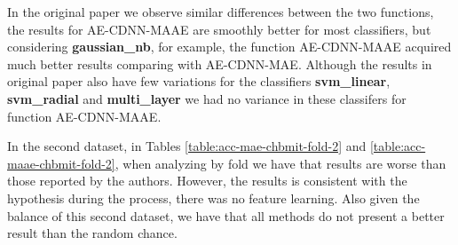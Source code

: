 In the original paper we observe similar differences between the two functions, the results for AE-CDNN-MAAE are smoothly better for most classifiers, but considering \textbf{gaussian\_nb}, for example, the function AE-CDNN-MAAE acquired much better results comparing with AE-CDNN-MAE. Although the results in original paper also have few variations for the classifiers \textbf{svm\_linear}, \textbf{svm\_radial} and \textbf{multi\_layer} we had no variance in these classifers for function AE-CDNN-MAAE.

In the second dataset, in Tables \ref{table:acc-mae-chbmit-fold-2} and \ref{table:acc-maae-chbmit-fold-2}, when analyzing by fold we have that results are worse than those reported by the authors. However, the results is consistent with the hypothesis during the process, there was no feature learning. Also given the balance of this second dataset, we have that all methods do not present a better result than the random chance. 

\begin{table}[!ht]
\centering
{}
\caption{Accuracy in Classification, with loss MAE, on each fold cross-validation, for Dataset 2.}
\label{table:acc-mae-chbmit-fold-2}
\end{table}

